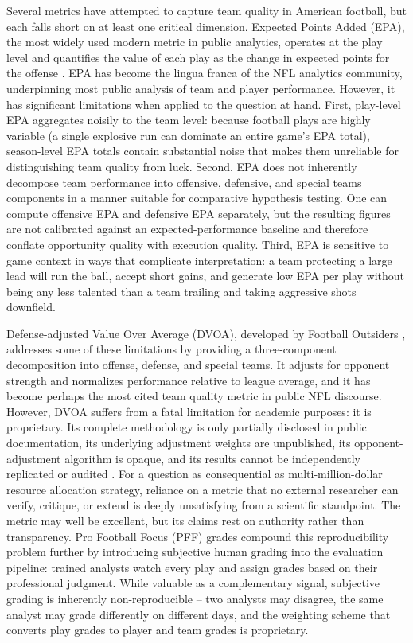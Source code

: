 Several metrics have attempted to capture team quality in American football, but each falls short on at least one critical dimension. Expected Points Added (EPA), the most widely used modern metric in public analytics, operates at the play level and quantifies the value of each play as the change in expected points for the offense \parencite{yurko2019nflwar}. EPA has become the lingua franca of the NFL analytics community, underpinning most public analysis of team and player performance. However, it has significant limitations when applied to the question at hand. First, play-level EPA aggregates noisily to the team level: because football plays are highly variable (a single explosive run can dominate an entire game's EPA total), season-level EPA totals contain substantial noise that makes them unreliable for distinguishing team quality from luck. Second, EPA does not inherently decompose team performance into offensive, defensive, and special teams components in a manner suitable for comparative hypothesis testing. One can compute offensive EPA and defensive EPA separately, but the resulting figures are not calibrated against an expected-performance baseline and therefore conflate opportunity quality with execution quality. Third, EPA is sensitive to game context in ways that complicate interpretation: a team protecting a large lead will run the ball, accept short gains, and generate low EPA per play without being any less talented than a team trailing and taking aggressive shots downfield.

Defense-adjusted Value Over Average (DVOA), developed by Football Outsiders \parencite{schatz2005dvoa}, addresses some of these limitations by providing a three-component decomposition into offense, defense, and special teams. It adjusts for opponent strength and normalizes performance relative to league average, and it has become perhaps the most cited team quality metric in public NFL discourse. However, DVOA suffers from a fatal limitation for academic purposes: it is proprietary. Its complete methodology is only partially disclosed in public documentation, its underlying adjustment weights are unpublished, its opponent-adjustment algorithm is opaque, and its results cannot be independently replicated or audited \parencite{massey2013loserscurse}. For a question as consequential as multi-million-dollar resource allocation strategy, reliance on a metric that no external researcher can verify, critique, or extend is deeply unsatisfying from a scientific standpoint. The metric may well be excellent, but its claims rest on authority rather than transparency. Pro Football Focus (PFF) grades \parencite{pff2014grades} compound this reproducibility problem further by introducing subjective human grading into the evaluation pipeline: trained analysts watch every play and assign grades based on their professional judgment. While valuable as a complementary signal, subjective grading is inherently non-reproducible  -- two analysts may disagree, the same analyst may grade differently on different days, and the weighting scheme that converts play grades to player and team grades is proprietary.

